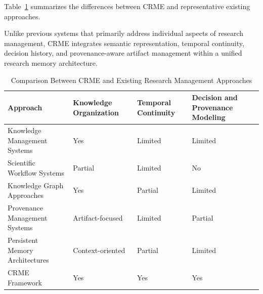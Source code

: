 Table~\ref{tab:related_work_comparison} summarizes the differences between CRME and representative existing approaches.

Unlike previous systems that primarily address individual aspects of research management, CRME integrates semantic representation, temporal continuity, decision history, and provenance-aware artifact management within a unified research memory architecture.


\begin{table}[t]
\centering
\caption{Comparison Between CRME and Existing Research Management Approaches}
\label{tab:related_work_comparison}
\begin{tabular}{p{2.1cm}p{2.0cm}p{2.0cm}p{2.0cm}}
\toprule
Approach &
Knowledge Organization &
Temporal Continuity &
Decision and Provenance Modeling
\\
\midrule

Knowledge Management Systems &
Yes &
Limited &
Limited
\\

Scientific Workflow Systems &
Partial &
Limited &
No
\\

Knowledge Graph Approaches &
Yes &
Partial &
Limited
\\

Provenance Management Systems &
Artifact-focused &
Limited &
Partial
\\

Persistent Memory Architectures &
Context-oriented &
Partial &
Limited
\\

CRME Framework &
Yes &
Yes &
Yes
\\

\bottomrule
\end{tabular}
\end{table}

